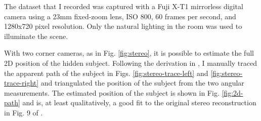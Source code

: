 \documentclass{article}
\begin{document}
The dataset that I recorded was captured with a Fuji X-T1 mirrorless digital camera using a 23mm fixed-zoom lens, ISO 800, 60 frames per second, and 1280x720 pixel resolution. Only the natural lighting in the room was used to illuminate the scene. 

With two corner cameras, as in Fig. \ref{fig:stereo}, it is possible to estimate the full 2D position of the hidden subject. Following the derivation in \cite{bouman_turningcornerscameras2017}, I manually traced the apparent path of the subject in Figs. \ref{fig:stereo-trace-left} and \ref{fig:stereo-trace-right} and triangulated the position of the subject from the two angular measurements. The estimated position of the subject is shown in Fig. \ref{fig:2d-path} and is, at least qualitatively, a good fit to the original stereo reconstruction in Fig. 9 of \cite{bouman_turningcornerscameras2017}. 
\end{document}
